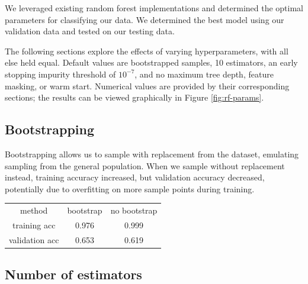 \documentclass{article}
\begin{document}
\begin{multicols}{2}
We leveraged existing random forest implementations
and determined the optimal parameters for classifying our data.
We determined the best model using our validation data
and tested on our testing data.

The following sections explore the effects of varying hyperparameters,
with all else held equal.
Default values are bootstrapped samples,
10 estimators, an early stopping impurity threshold of $10^{-7}$,
and no maximum tree depth,
feature masking, or warm start.
Numerical values are provided by
their corresponding sections;
the results can be viewed graphically
in Figure \ref{fig:rf-params}.

\subsection{Bootstrapping}

Bootstrapping allows us to sample with replacement
from the dataset,
emulating sampling from the general population.
When we sample without replacement instead,
training accuracy increased,
but validation accuracy decreased,
potentially due to overfitting on more sample points during training.

%
\begin{center}
    \begin{tabular}{c| c c}
        method & bootstrap & no bootstrap \\
        training acc
        		& 0.976 & 0.999 \\
        validation acc
        		& 0.653 & 0.619
    \end{tabular}
\end{center}

\subsection{Number of estimators}


\end{multicols}
\end{document}
